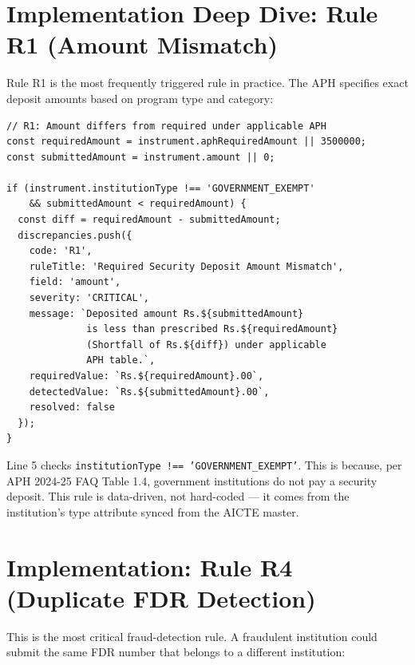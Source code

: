 \documentclass[12pt, a4paper]{report}
\begin{document}
\section{Implementation Deep Dive: Rule R1 (Amount Mismatch)}

Rule R1 is the most frequently triggered rule in practice. The APH specifies exact deposit amounts based on program type and category:

\begin{lstlisting}[caption={Rule R1 Implementation (rulesEngine.ts, lines 10--25)}, label={lst:r1}]
// R1: Amount differs from required under applicable APH
const requiredAmount = instrument.aphRequiredAmount || 3500000;
const submittedAmount = instrument.amount || 0;

if (instrument.institutionType !== 'GOVERNMENT_EXEMPT'
    && submittedAmount < requiredAmount) {
  const diff = requiredAmount - submittedAmount;
  discrepancies.push({
    code: 'R1',
    ruleTitle: 'Required Security Deposit Amount Mismatch',
    field: 'amount',
    severity: 'CRITICAL',
    message: `Deposited amount Rs.${submittedAmount}
              is less than prescribed Rs.${requiredAmount}
              (Shortfall of Rs.${diff}) under applicable
              APH table.`,
    requiredValue: `Rs.${requiredAmount}.00`,
    detectedValue: `Rs.${submittedAmount}.00`,
    resolved: false
  });
}
\end{lstlisting}

\begin{designbox}[title={Why Government Institutions Are Exempt}]
Line 5 checks \texttt{institutionType !== 'GOVERNMENT\_EXEMPT'}. This is because, per APH 2024-25 FAQ Table 1.4, government institutions do not pay a security deposit. This rule is data-driven, not hard-coded --- it comes from the institution's type attribute synced from the AICTE master.
\end{designbox}

\section{Implementation: Rule R4 (Duplicate FDR Detection)}

This is the most critical fraud-detection rule. A fraudulent institution could submit the same FDR number that belongs to a different institution:
\end{document}
